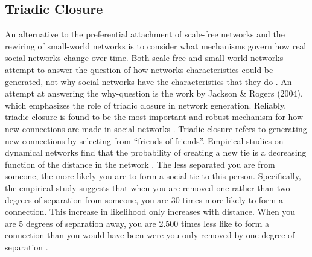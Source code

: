 \documentclass{article}
\begin{document}
\subsection{Triadic Closure}
An alternative to the preferential attachment of scale-free networks and the rewiring of small-world networks is to consider what mechanisms govern how real social networks change over time. Both scale-free and small world networks attempt to answer the question of how networks characteristics could be generated, not why social networks have the characteristics that they do \cite{jackson_search_2004}. An attempt at answering the why-question is the work by Jackson \& Rogers (2004), which emphasizes the role of triadic closure in network generation. Reliably, triadic closure is found to be the most important and robust mechanism for how new connections are made in social networks \cite{asikainen_cumulative_2020,bianconi_triadic_2014,kossinets_origins_2009,peixoto_disentangling_2022}. Triadic closure refers to generating new connections by selecting from “friends of friends”. Empirical studies on dynamical networks find that the probability of creating a new tie is a decreasing function of the distance in the network \cite{bener_empirical_2016,kossinets_origins_2009}. The less separated you are from someone, the more likely you are to form a social tie to this person. Specifically, the empirical study suggests that when you are removed one rather than two degrees of separation from someone, you are 30 times more likely to form a connection. This increase in likelihood only increases with distance. When you are 5 degrees of separation away, you are 2.500 times less like to form a connection than you would have been were you only removed by one degree of separation \cite{kossinets_origins_2009}. 
\end{document}
